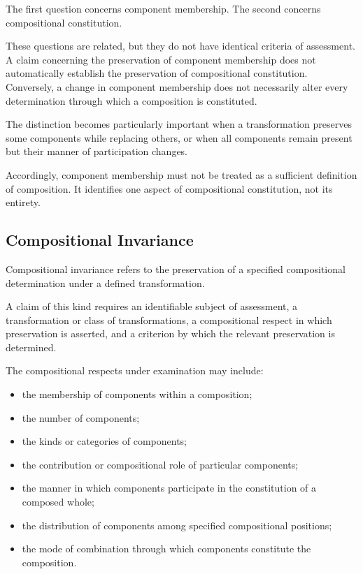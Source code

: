 The first question concerns component membership.
The second concerns compositional constitution.

These questions are related, but they do not have identical
criteria of assessment. A claim concerning the preservation
of component membership does not automatically establish
the preservation of compositional constitution. Conversely,
a change in component membership does not necessarily
alter every determination through which a composition
is constituted.

The distinction becomes particularly important when a
transformation preserves some components while replacing
others, or when all components remain present but their
manner of participation changes.

Accordingly, component membership must not be treated
as a sufficient definition of composition. It identifies
one aspect of compositional constitution, not its entirety.

\subsection{Compositional Invariance}

Compositional invariance refers to the preservation of
a specified compositional determination under a defined
transformation.

A claim of this kind requires an identifiable subject
of assessment, a transformation or class of transformations,
a compositional respect in which preservation is asserted,
and a criterion by which the relevant preservation
is determined.

The compositional respects under examination may include:

\begin{itemize}
    \item the membership of components within a composition;
    \item the number of components;
    \item the kinds or categories of components;
    \item the contribution or compositional role of particular
          components;
    \item the manner in which components participate in
          the constitution of a composed whole;
    \item the distribution of components among specified
          compositional positions;
    \item the mode of combination through which components
          constitute the composition.
\end{itemize}

